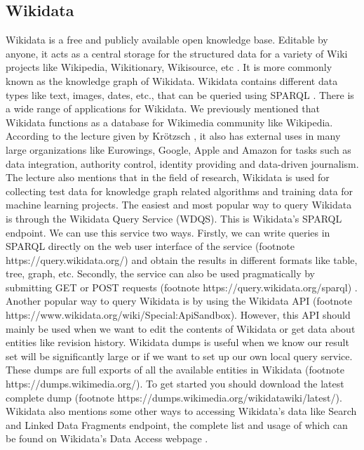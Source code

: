 \documentclass[12 pt, a4paper]{report}
\theoremstyle{definition}
\begin{document}
{\subsection{Wikidata}
Wikidata is a free and publicly available open knowledge base.  Editable by anyone, it acts as a central storage for the structured data for a variety of Wiki projects like Wikipedia, Wikitionary, Wikisource, etc \cite{Wikidata2019}. It is more commonly known as the knowledge graph of Wikidata. Wikidata contains different data types like text, images, dates, etc., that can be queried using SPARQL \cite{Carpentry2016}. 
There is a wide range of applications for Wikidata. We previously mentioned that Wikidata functions as a database for Wikimedia community like Wikipedia. According to the lecture given by Krötzsch \cite{Kroetzsch2020}, it also has external uses in many large organizations like Eurowings, Google, Apple and Amazon for tasks such as data integration, authority control, identity providing and data-driven journalism. The lecture also mentions that in the field of research, Wikidata is used for collecting test data for knowledge graph related algorithms and training data for machine learning projects.
The easiest and most popular way to query Wikidata is through the Wikidata Query Service (WDQS). This is Wikidata’s SPARQL endpoint. We can use this service two ways. Firstly, we can write queries in SPARQL directly on the web user interface of the service (footnote https://query.wikidata.org/) and obtain the results in different formats like table, tree, graph, etc. Secondly, the service can also be used pragmatically by submitting GET or POST requests (footnote https://query.wikidata.org/sparql) \cite{Wikidata2022}. 
Another popular way to query Wikidata is by using the Wikidata API (footnote https://www.wikidata.org/wiki/Special:ApiSandbox). However, this API should mainly be used when we want to edit the contents of Wikidata or get data about entities like revision history.
Wikidata dumps is useful when we know our result set will be significantly large or if we want to set up our own local query service. These dumps are full exports of all the available entities in Wikidata (footnote https://dumps.wikimedia.org/). To get started you should download the latest complete dump (footnote https://dumps.wikimedia.org/wikidatawiki/latest/). Wikidata also mentions some other ways to accessing Wikidata’s data like Search and Linked Data Fragments endpoint, the complete list and usage of which can be found on Wikidata’s Data Access webpage \cite{ Wikidata2022}.

}
\end{document}
